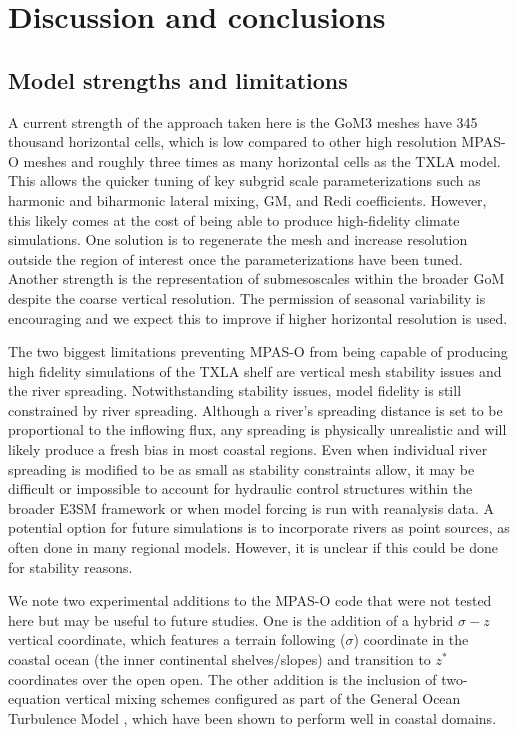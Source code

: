 \section{Discussion and conclusions}
\subsection{Model strengths and limitations}
A current strength of the approach taken here is the GoM3 meshes have 345 thousand horizontal cells, which is low compared to other high resolution MPAS-O meshes \citep{caldwell2019doe, hoch2020mpas} and roughly three times as many horizontal cells as the TXLA model. This allows the quicker tuning of key subgrid scale parameterizations such as harmonic and biharmonic lateral mixing, GM, and Redi coefficients. However, this likely comes at the cost of being able to produce high-fidelity climate simulations. One solution is to regenerate the mesh and increase resolution outside the region of interest once the parameterizations have been tuned. Another strength is the representation of submesoscales within the broader GoM despite the coarse vertical resolution. The permission of seasonal variability is encouraging and we expect this to improve if higher horizontal resolution is used. 

The two biggest limitations preventing MPAS-O from being capable of producing high fidelity simulations of the TXLA shelf are vertical mesh stability issues and the river spreading. Notwithstanding stability issues, model fidelity is still constrained by river spreading. Although a river's spreading distance is set to be proportional to the inflowing flux, any spreading is physically unrealistic and will likely produce a fresh bias in most coastal regions. Even when individual river spreading is modified to be as small as stability constraints allow, it may be difficult or impossible to account for hydraulic control structures within the broader E3SM framework or when model forcing is run with reanalysis data. A potential option for future simulations is to incorporate rivers as point sources, as often done in many regional models. However, it is unclear if this could be done for stability reasons.

We note two experimental additions to the MPAS-O code that were not tested here but may be useful to future studies. One is the addition of a hybrid $\sigma-z$ vertical coordinate, which features a terrain following ($\sigma$) coordinate in the coastal ocean (the inner continental shelves/slopes) and transition to $z^*$ coordinates over the open open. The other addition is the inclusion of two-equation vertical mixing schemes configured as part of the General Ocean Turbulence Model \citep{burchard1999gotm, Warner_2005}, which have been shown to perform well in coastal domains. 

